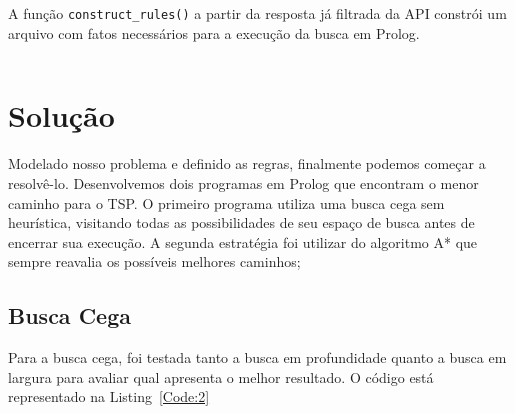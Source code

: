 \documentclass[12pt,a4paper]{article}
\begin{document}
A função  \texttt{construct_rules()} a partir da resposta já filtrada da API constrói um arquivo com fatos necessários para a execução da busca em Prolog.

\begin{mdframed}[linecolor=black, topline=true, bottomline=true,
  leftline=false, rightline=false, backgroundcolor=yellow!10!white]
\inputminted[tabsize=2,linenos=true,fontsize=\footnotesize,breaklines=true,breakafter=format]{python}{../DistanceMatrix.py}
\end{mdframed}
  \label{Code:1}
\newpage
\section{Solução}
Modelado nosso problema e definido as regras, finalmente podemos começar a resolvê-lo. Desenvolvemos dois programas em Prolog que encontram o menor caminho para o TSP. O primeiro programa utiliza uma busca cega sem heurística, visitando todas as possibilidades de seu espaço de busca antes de encerrar sua execução. A segunda estratégia foi utilizar do algoritmo A* que sempre reavalia os possíveis melhores caminhos;
\subsection{Busca Cega}
Para a busca cega, foi testada tanto a busca em profundidade quanto a busca em largura para avaliar qual apresenta o melhor resultado. O código está representado na Listing~\ref{Code:2}
\begin{mdframed}[linecolor=black, topline=true, bottomline=true,
  leftline=false, rightline=false, backgroundcolor=yellow!10!white]
\inputminted[tabsize=2,linenos=true,fontsize=\footnotesize,breaklines=true,breakafter=format]{prolog}{../buscacega_profundidade.pl}
\end{mdframed}
  \label{Code:2}
\end{document}
